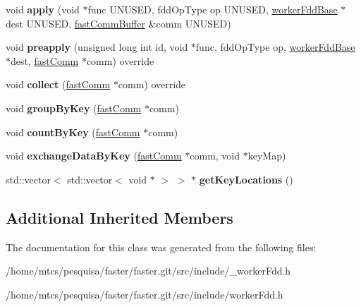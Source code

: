 \begin{DoxyCompactItemize}
\item 
\hypertarget{classfaster_1_1workerFdd_a7b54fa501fd3cd31a27b95cc55b6235a}{}void {\bfseries apply} (void $\ast$func U\+N\+U\+S\+E\+D, fdd\+Op\+Type op U\+N\+U\+S\+E\+D, \hyperlink{classfaster_1_1workerFddBase}{worker\+Fdd\+Base} $\ast$dest U\+N\+U\+S\+E\+D, \hyperlink{classfaster_1_1fastCommBuffer}{fast\+Comm\+Buffer} \&comm U\+N\+U\+S\+E\+D)\label{classfaster_1_1workerFdd_a7b54fa501fd3cd31a27b95cc55b6235a}

\item 
\hypertarget{classfaster_1_1workerFdd_a245c74dd6908a15c8e4310e21c25f867}{}void {\bfseries preapply} (unsigned long int id, void $\ast$func, fdd\+Op\+Type op, \hyperlink{classfaster_1_1workerFddBase}{worker\+Fdd\+Base} $\ast$dest, \hyperlink{classfaster_1_1fastComm}{fast\+Comm} $\ast$comm) override\label{classfaster_1_1workerFdd_a245c74dd6908a15c8e4310e21c25f867}

\item 
\hypertarget{classfaster_1_1workerFdd_a429828080212db643940e5761b9bc27c}{}void {\bfseries collect} (\hyperlink{classfaster_1_1fastComm}{fast\+Comm} $\ast$comm) override\label{classfaster_1_1workerFdd_a429828080212db643940e5761b9bc27c}

\item 
\hypertarget{classfaster_1_1workerFdd_a4e4649c682140139aa4d8e7612086bfd}{}void {\bfseries group\+By\+Key} (\hyperlink{classfaster_1_1fastComm}{fast\+Comm} $\ast$comm)\label{classfaster_1_1workerFdd_a4e4649c682140139aa4d8e7612086bfd}

\item 
\hypertarget{classfaster_1_1workerFdd_a4be02069920848e005273f560e99b3c8}{}void {\bfseries count\+By\+Key} (\hyperlink{classfaster_1_1fastComm}{fast\+Comm} $\ast$comm)\label{classfaster_1_1workerFdd_a4be02069920848e005273f560e99b3c8}

\item 
\hypertarget{classfaster_1_1workerFdd_a125d58b5669006099a3ce4fd7042413a}{}void {\bfseries exchange\+Data\+By\+Key} (\hyperlink{classfaster_1_1fastComm}{fast\+Comm} $\ast$comm, void $\ast$key\+Map)\label{classfaster_1_1workerFdd_a125d58b5669006099a3ce4fd7042413a}

\item 
\hypertarget{classfaster_1_1workerFdd_a65f3935109ac34d4533d6b8bdc7a049e}{}std\+::vector$<$ std\+::vector$<$ void $\ast$ $>$ $>$ $\ast$ {\bfseries get\+Key\+Locations} ()\label{classfaster_1_1workerFdd_a65f3935109ac34d4533d6b8bdc7a049e}

\end{DoxyCompactItemize}
\subsection*{Additional Inherited Members}


The documentation for this class was generated from the following files\+:\begin{DoxyCompactItemize}
\item 
/home/mtcs/pesquisa/faster/faster.\+git/src/include/\+\_\+worker\+Fdd.\+h\item 
/home/mtcs/pesquisa/faster/faster.\+git/src/include/worker\+Fdd.\+h\end{DoxyCompactItemize}
